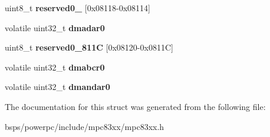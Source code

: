\begin{DoxyCompactItemize}
\item 
\mbox{\label{structm83xxDMARegisters___1_1m83xxDMAChannelRegisters___a00ae0f05f5a5e69d096e59b2d4cd9382}} 
uint8\+\_\+t {\bfseries reserved0\+\_} \mbox{[}0x08118-\/0x08114\mbox{]}
\item 
\mbox{\label{structm83xxDMARegisters___1_1m83xxDMAChannelRegisters___ae4d219f15d05557e634ec302efe3d512}} 
volatile uint32\+\_\+t {\bfseries dmadar0}
\item 
\mbox{\label{structm83xxDMARegisters___1_1m83xxDMAChannelRegisters___a942c2229d99a83613b478ba3f364919d}} 
uint8\+\_\+t {\bfseries reserved0\+\_\+811C} \mbox{[}0x08120-\/0x0811\+C\mbox{]}
\item 
\mbox{\label{structm83xxDMARegisters___1_1m83xxDMAChannelRegisters___a4ea93d31b25da6c8161457469f3aa280}} 
volatile uint32\+\_\+t {\bfseries dmabcr0}
\item 
\mbox{\label{structm83xxDMARegisters___1_1m83xxDMAChannelRegisters___a00fa2539f996134243d9757f78c29ce1}} 
volatile uint32\+\_\+t {\bfseries dmandar0}
\end{DoxyCompactItemize}


The documentation for this struct was generated from the following file\+:\begin{DoxyCompactItemize}
\item 
bsps/powerpc/include/mpc83xx/mpc83xx.\+h\end{DoxyCompactItemize}
